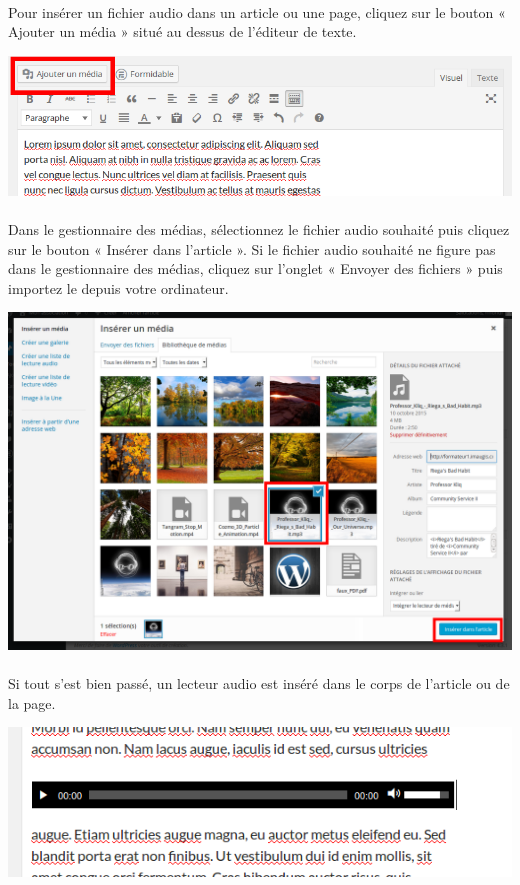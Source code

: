 \documentclass[10pt,a4paper]{article}
\begin{document}
\paragraph{}Pour insérer un fichier audio dans un article ou une page, cliquez sur le bouton « Ajouter un média » situé au dessus de l'éditeur de texte.
\begin{center}
\includegraphics[scale=0.3]{img/0102.png}
\end{center}
\paragraph{}Dans le gestionnaire des médias, sélectionnez le fichier audio souhaité puis cliquez sur le bouton « Insérer dans l'article ». Si le fichier audio souhaité ne figure pas dans le gestionnaire des médias, cliquez sur l'onglet « Envoyer des fichiers » puis importez le depuis votre ordinateur.
\begin{center}
\includegraphics[scale=0.25]{img/0120.png}
\end{center}
\paragraph{}Si tout s'est bien passé, un lecteur audio est inséré dans le corps de l'article ou de la page.
\begin{center}
\includegraphics[scale=0.3]{img/0121.png}
\end{center}
\end{document}
